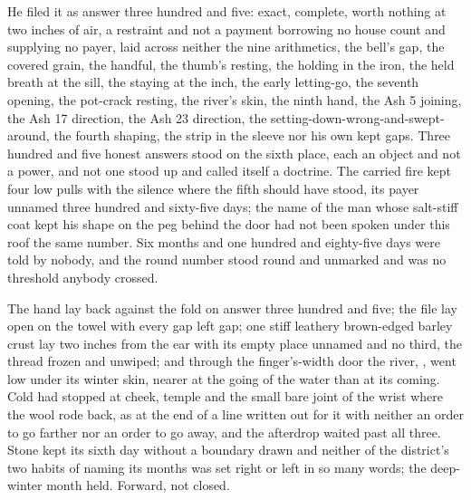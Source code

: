 He filed it as answer three hundred and five: exact, complete, worth nothing at two inches of air, a restraint and not a payment borrowing no house count and supplying no payer, laid across neither the nine arithmetics, the bell's gap, the covered grain, the handful, the thumb's resting, the holding in the iron, the held breath at the sill, the staying at the inch, the early letting-go, the seventh opening, the pot-crack resting, the river's skin, the ninth hand, the Ash 5 joining, the Ash 17 direction, the Ash 23 direction, the setting-down-wrong-and-swept-around, the fourth shaping, the strip in the sleeve nor his own kept gaps. Three hundred and five honest answers stood on the sixth place, each an object and not a power, and not one stood up and called itself a doctrine. The carried fire kept four low pulls with the silence where the fifth should have stood, its payer unnamed three hundred and sixty-five days; the name of the man whose salt-stiff coat kept his shape on the peg behind the door had not been spoken under this roof the same number. Six months and one hundred and eighty-five days were told by nobody, and the round number stood round and unmarked and was no threshold anybody crossed.

The hand lay back against the fold on answer three hundred and five; the file lay open on the towel with every gap left gap; one stiff leathery brown-edged barley crust lay two inches from the ear with its empty place unnamed and no third, the thread frozen and unwiped; and through the finger's-width door the river, , went low under its winter skin, nearer at the going of the water than at its coming. Cold had stopped at cheek, temple and the small bare joint of the wrist where the wool rode back, as at the end of a line written out for it with neither an order to go farther nor an order to go away, and the afterdrop waited past all three. Stone kept its sixth day without a boundary drawn and neither of the district's two habits of naming its months was set right or left in so many words; the deep-winter month held. Forward, not closed.

